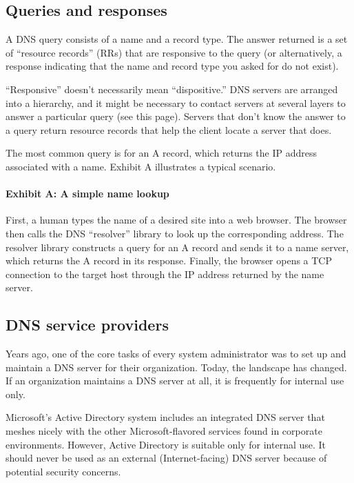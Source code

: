 \subsection{Queries and responses}
\label{sec:queries-and-responses}

A DNS query consists of a name and a record type.
The answer returned is a set of ``resource records'' (RRs) that are responsive to the query (or alternatively,
a response indicating that the name and record type you asked for do not exist).

``Responsive'' doesn't necessarily mean ``dispositive.'' DNS servers are
arranged into a hierarchy, and it might be necessary to contact servers
at several layers to answer a particular query (see this page).
Servers that don't know the answer to a query return resource records that help the client locate a server that does.

The most common query is for an A record, which returns the IP address associated with a name.
Exhibit A illustrates a typical scenario.

\paragraph[{Exhibit A: }A simple name lookup]{\texorpdfstring{{Exhibit
A:
}\protect\hypertarget{part0024_split_002.htmlux5cux23_idTextAnchor843}{}{}A
simple name lookup}{Exhibit A: A simple name lookup}}


First, a human types the name of a desired site into a web browser. The
browser then calls the DNS ``resolver'' library to look up the
corresponding address. The resolver library constructs a query for an A
record and sends it to a name server, which returns the A record in its
response. Finally, the browser opens a TCP connection to the target host
through the IP address returned by the name server.


\subsection{DNS service providers}

Years ago, one of the core tasks of every system administrator was to set up and maintain a DNS server for their organization.
Today, the landscape has changed.
If an organization maintains a DNS server at all, it is frequently for internal use only.

Microsoft's Active Directory system includes an integrated DNS server that meshes nicely with the other Microsoft-flavored services found in corporate environments.
However, Active Directory is suitable only for internal use.
It should never be used as an external (Internet-facing) DNS server because of potential security concerns.

